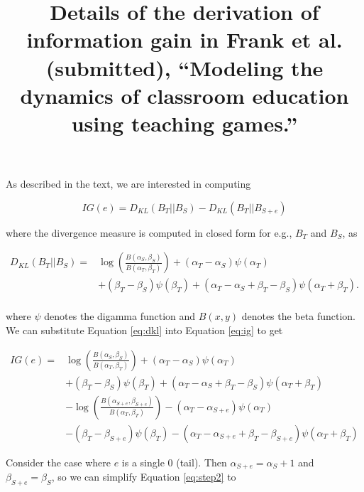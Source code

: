 \documentclass[12pt]{article}
\title{Details of the derivation of information gain in Frank et al. (submitted), ``Modeling the dynamics of classroom education using teaching games.''}
\date{}
\begin{document}
\maketitle

As described in the text, we are interested in computing

\begin{equation}
\label{eq:ig}
IG(e) = D_{KL} ( B_T || B_{S} )  - D_{KL} (B_T ||B_{S+e} ) 
\end{equation}

\noindent where the divergence measure is computed in closed form for e.g., $B_T$ and $B_S$, as

\begin{equation}
\label{eq:dkl}
\begin{split}
D_{KL} (B_T ||B_{S} )  = & \log( \frac{B(\alpha_{S},\beta_{S})}{B(\alpha_{T},\beta_{T})}) +  (\alpha_T - \alpha_S) \psi (\alpha_T) \\ 
& + (\beta_T - \beta_S) \psi (\beta_T) +  (\alpha_T - \alpha_S + \beta_T - \beta_S) \psi (\alpha_T + \beta_T). \\
\end{split}
\end{equation}

\noindent where $\psi$ denotes the digamma function and $B(x,y)$ denotes the beta function. We can substitute Equation \ref{eq:dkl} into Equation \ref{eq:ig} to get

\begin{equation}
\begin{split}
IG(e)  = & \log( \frac{B(\alpha_{S},\beta_{S})}{B(\alpha_{T},\beta_{T})}) + (\alpha_T - \alpha_S) \psi (\alpha_T)  \\ 
& + (\beta_T - \beta_S) \psi (\beta_T) +  (\alpha_T - \alpha_S + \beta_T - \beta_S) \psi (\alpha_T + \beta_T)  \\
& - \log( \frac{B(\alpha_{S+e},\beta_{S+e})}{B(\alpha_{T},\beta_{T})}) - (\alpha_T - \alpha_{S+e}) \psi (\alpha_T) \\ 
& - (\beta_T - \beta_{S+e}) \psi (\beta_T) - (\alpha_T - \alpha_{S+e} + \beta_T - \beta_{S+e}) \psi (\alpha_T + \beta_T)
\end{split}
\label{eq:step2}
\end{equation}

Consider the case where $e$ is a single 0 (tail). Then $\alpha_{S+e}= \alpha_S + 1$ and $\beta_{S+e}= \beta_{S}$, so we can simplify Equation \ref{eq:step2} to
\end{document}
